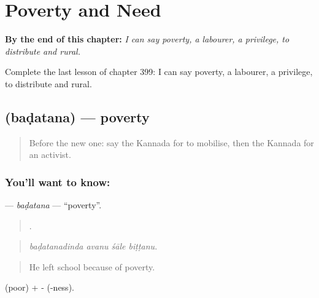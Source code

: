 
\chapter{Poverty and Need}
\label{ch:ka-poverty-and-need}

\begin{chapteropening}
\textbf{By the end of this chapter:} \emph{I can say poverty, a labourer, a privilege, to distribute and rural.}

Complete the last lesson of chapter 399: I can say poverty, a labourer, a privilege, to distribute and rural.
\end{chapteropening}

\section[\texorpdfstring{\kn{ಬಡತನ} (baḍatana)}{ಬಡತನ (baḍatana)}]{ (baḍatana) — poverty}

\label{lesson:KA-C399-badatana}



\begin{quote}
Before the new one: say the Kannada for to mobilise, then the Kannada for an activist.
\end{quote}

\subsection*{You'll want to know: }
\textbf{} — \emph{baḍatana} — \textquotedblleft{}poverty\textquotedblright{}.

\begin{quote}
   .
\end{quote}

\begin{quote}
\emph{baḍatanadinda avanu śāle biṭṭanu.}
\end{quote}

\begin{quote}
He left school because of poverty.
\end{quote}

 (poor) + - (-ness).

